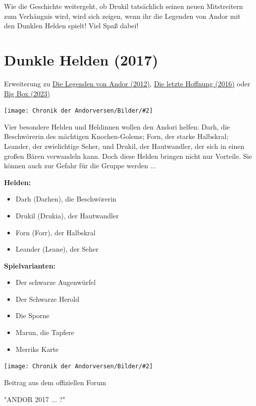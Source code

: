 \documentclass[10pt, a4paper, oneside]{book}
\newcommand{\fillbreak}{\vspace*{\fill}\columnbreak}
\newcommand{\produkt}[1]{%
    \section{#1}%
    \label{Produkt: #1}%
}
\newcommand{\refprodukt}[1]{\hyperref[Produkt: #1]{#1}}
\newcommand{\bildmitts}[2][height=0.32\textwidth,width=0.48\textwidth,keepaspectratio]{%
    \begin{center}
        \texttt{[image: Chronik der Andorversen/Bilder/\#2]}
    \end{center}
}
\begin{document}
\begin{multicols}{2}
Wie die Geschichte weitergeht, ob Drukil tatsächlich seinen neuen Mitstreitern zum Verhängnis wird, wird sich zeigen, wenn ihr die Legenden von Andor mit den Dunklen Helden spielt! Viel Spaß dabei!


\fillbreak

\produkt{Dunkle Helden (2017)}

\begin{center}
    Erweiterung zu \refprodukt{Die Legenden von Andor (2012)}, \refprodukt{Die letzte Hoffnung (2016)} oder \refprodukt{Big Box (2023)}
\end{center}

\bildmitts{Dunkle Helden (2017).png}

Vier besondere Helden und Heldinnen wollen den Andori helfen: Darh, die Beschwörerin des mächtigen Knochen-Golems; Forn, der starke Halbskral; Leander, der zwielichtige Seher, und Drukil, der Hautwandler, der sich in einen großen Bären verwandeln kann. Doch diese Helden bringen nicht nur Vorteile. Sie können auch zur Gefahr für die Gruppe werden ...\bigskip

\textbf{Helden:}

\begin{itemize}[topsep=0pt,itemsep=-1ex,partopsep=1ex,parsep=1ex]
    \item Darh (Darhen), die Beschwörerin
    \item Drukil (Drukia), der Hautwandler
    \item Forn (Forr), der Halbskral
    \item Leander (Leane), der Seher
\end{itemize}

\textbf{Spielvarianten:} 

\begin{itemize}[topsep=0pt,itemsep=-1ex,partopsep=1ex,parsep=1ex]
    \item Der schwarze Augenwürfel
    \item Der Schwarze Herold
    \item Die Sporne
    \item Marun, die Tapfere
    \item Merriks Karte
\end{itemize}

\bildmitts{Wallpaper Eara Drukil.jpg}

\begin{center}
    Beitrag aus dem offiziellen Forum

    "ANDOR 2017 ... ?"
\end{center}


\end{multicols}
\end{document}

